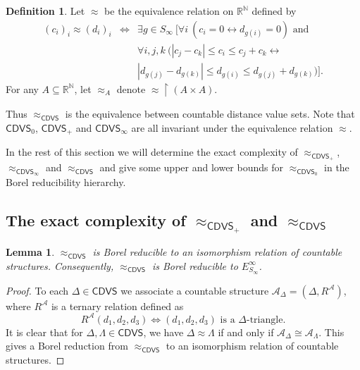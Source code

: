 \documentclass{amsart}
\newtheorem{lemma}[theorem]{Lemma}
\theoremstyle{definition}
\newtheorem{definition}{Definition}[section]
\theoremstyle{remark}
\begin{document}
\begin{definition}\label{def:er} %
Let $\approx$ be the equivalence relation on $\mathbb{R}^{\mathbb{N}}$ defined by
$$\begin{array}{rcl} (c_i)_i\approx (d_i)_i&\iff& \exists g\in S_\infty\ [\forall i\ (c_i=0\longleftrightarrow d_{g(i)}=0) \mbox{ and } \\
& & \forall i, j, k\ (|c_j-c_k|\leq c_i\leq c_j+c_k\longleftrightarrow \\
& & |d_{g(j)}-d_{g(k)}|\leq d_{g(i)}\leq d_{g(j)}+d_{g(k)})].
\end{array}
$$
For any $A\subseteq \mathbb{R}^{\mathbb{N}}$, %
let $\approx_A$ denote $\approx\upharpoonright (A\times A)$.
\end{definition}

Thus $\approx_{\mathsf{CDVS}}$ is the equivalence between countable distance value sets. Note that $\mathsf{CDVS}_0$, $\mathsf{CDVS}_+$ and $\mathsf{CDVS}_\infty$ are all invariant under the equivalence relation $\approx$. 

In the rest of this section we will determine the exact complexity of $\approx_{\mathsf{CDVS}_+}$, $\approx_{\mathsf{CDVS}_\infty}$ and $\approx_{\mathsf{CDVS}}$ and give some upper and lower bounds for $\approx_{\mathsf{CDVS}_0}$ in the Borel reducibility hierarchy.



\subsection{The exact complexity of $\approx_{\mathsf{CDVS}_+}$ and $\approx_{\mathsf{CDVS}}$}

\begin{lemma}\label{lem:isomorphism} $\approx_{\mathsf{CDVS}}$ is Borel reducible to an isomorphism relation of countable structures. Consequently, $\approx_{\mathsf{CDVS}}$ is Borel reducible to $E^\infty_{S_\infty}$.
\end{lemma}

\begin{proof} To each $\Delta\in \mathsf{CDVS}$ we associate a countable structure $\mathcal{A}_\Delta=(\Delta, R^{\mathcal{A}})$, where $R^{\mathcal{A}}$ is a ternary relation defined as
$$ R^{\mathcal{A}}(d_1,d_2,d_3)\iff \mbox{$(d_1,d_2,d_3)$ is a $\Delta$-triangle.}$$
It is clear that for $\Delta, \Lambda\in \mathsf{CDVS}$, we have $\Delta\approx \Lambda$ if and only if $\mathcal{A}_\Delta\cong \mathcal{A}_{\Lambda}$. This gives a Borel reduction from $\approx_{\mathsf{CDVS}}$ to an isomorphism relation of countable structures.
\end{proof}
\end{document}

